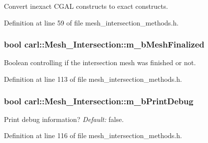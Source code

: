 Convert inexact C\+G\+A\+L constructs to exact constructs. 



Definition at line 59 of file mesh\+\_\+intersection\+\_\+methods.\+h.

\hypertarget{classcarl_1_1_mesh___intersection_ae858bc08b5286b0562eaf94372944bcd}{}
\subsubsection[{m\+\_\+b\+Mesh\+Finalized}]{\setlength{\rightskip}{0pt plus 5cm}bool carl\+::\+Mesh\+\_\+\+Intersection\+::m\+\_\+b\+Mesh\+Finalized\hspace{0.3cm}{\ttfamily [protected]}}\label{classcarl_1_1_mesh___intersection_ae858bc08b5286b0562eaf94372944bcd}


Boolean controlling if the intersection mesh was finished or not. 



Definition at line 113 of file mesh\+\_\+intersection\+\_\+methods.\+h.

\hypertarget{classcarl_1_1_mesh___intersection_a086fd53554e5ecfad25b7b15012d71e4}{}
\subsubsection[{m\+\_\+b\+Print\+Debug}]{\setlength{\rightskip}{0pt plus 5cm}bool carl\+::\+Mesh\+\_\+\+Intersection\+::m\+\_\+b\+Print\+Debug\hspace{0.3cm}{\ttfamily [protected]}}\label{classcarl_1_1_mesh___intersection_a086fd53554e5ecfad25b7b15012d71e4}


Print debug information? {\itshape Default\+:} false. 



Definition at line 116 of file mesh\+\_\+intersection\+\_\+methods.\+h.

\hypertarget{classcarl_1_1_mesh___intersection_a256506b058cda4c9b767d14277b9650c}{}

